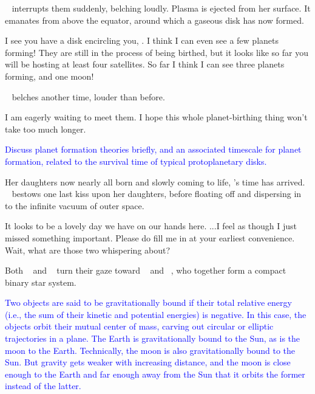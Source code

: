 \documentclass[main.tex]{subfiles}
\begin{document}
\par \nar \rmelectra~ interrupts them suddenly, belching loudly.  Plasma is ejected from her surface.  It emanates from above the equator, around which a gaseous disk has now formed.  

\par \Maia I see you have a disk encircling you, \rmelectra.  I think I can even see a few planets forming!  They are still in the process of being birthed, but it looks like so far you will be hosting at least four satellites.  So far I think I can see three planets forming, and one moon!

\par \nar \rmelectra~ belches another time, louder than before.

\par \Electra I am eagerly waiting to meet them.  I hope this whole planet-birthing thing won't take too much longer.

\begin{tcolorbox}[sharp corners, colback=blue!30, colframe=blue!80!blue, title=How do Planets Form?]
\par \textcolor{blue} {Discuss planet formation theories briefly, and an associated timescale for planet formation, related to the survival time of typical protoplanetary disks.}
\end{tcolorbox}

\par \nar Her daughters now nearly all born and slowly coming to life, \rmpleione's time has arrived. \rmpleione~ bestows one last kiss upon her daughters, before floating off and dispersing in to the infinite vacuum of outer space.

\par \Electra It looks to be a lovely day we have on our hands here. ...I feel as though I just missed something important.  Please do fill me in at your earliest convenience.  Wait, what are those two whispering about?

\par \nar Both \rmmaia~ and \rmelectra~ turn their gaze toward \rmtaygete~ and \rmalcyone~, who together form a compact binary star system.

\begin{tcolorbox}[sharp corners, colback=blue!30, colframe=blue!80!blue, title=Gravitationally Bound]
\par \textcolor{blue} {Two objects are said to be gravitationally bound if their total relative energy (i.e., the sum of their kinetic and potential energies) is negative.  In this case, the objects orbit their mutual center of mass, carving out circular or elliptic trajectories in a plane.  The Earth is gravitationally bound to the Sun, as is the moon to the Earth.  Technically, the moon is also gravitationally bound to the Sun.  But gravity gets weaker with increasing distance, and the moon is close enough to the Earth and far enough away from the Sun that it orbits the former instead of the latter.}  
\end{tcolorbox}
\end{document}
